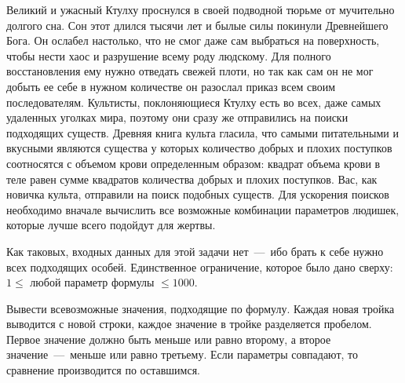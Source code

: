 Великий и ужасный Ктулху проснулся в своей подводной тюрьме от мучительно долгого сна. 
Сон этот длился тысячи лет и былые силы покинули Древнейшего Бога. 
Он ослабел настолько, что не смог даже сам выбраться на поверхность, чтобы нести хаос и разрушение всему роду людскому. 
Для полного восстановления ему нужно отведать свежей плоти, но так как сам он не мог добыть ее себе в нужном количестве он разослал приказ всем своим последователям. 
Культисты, поклоняющиеся Ктулху есть во всех, даже самых удаленных уголках мира, поэтому они сразу же отправились на поиски подходящих существ. 
Древняя книга культа гласила, что самыми питательными и вкусными являются существа у которых количество добрых и плохих поступков соотносятся с объемом крови определенным образом: 
квадрат объема крови в теле равен сумме квадратов количества добрых и плохих поступков. 
Вас, как новичка культа, отправили на поиск подобных существ. Для ускорения поисков необходимо вначале вычислить все возможные комбинации параметров людишек, 
которые лучше всего подойдут для жертвы.

\InputFile
\noindent
Как таковых, входных данных для этой задачи нет~---~ибо брать к себе нужно всех подходящих особей. Единственное ограничение, которое было дано сверху: 
$1 \leq $ любой параметр формулы $ \leq 1000$. 

\OutputFile
\noindent

Вывести всевозможные значения, подходящие по формулу. Каждая новая тройка выводится с новой строки, каждое значение в тройке разделяется пробелом. 
Первое значение должно быть меньше или равно второму, а второе значение~---~меньше или равно третьему. Если параметры совпадают, то сравнение производится по оставшимся.

\SAMPLES